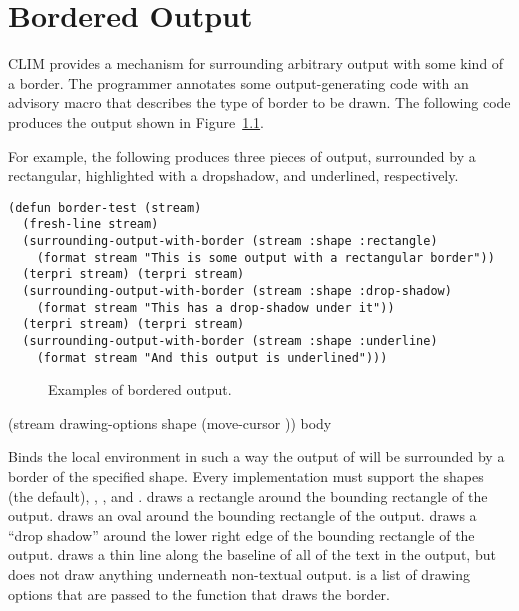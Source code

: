
\chapter {Bordered Output}
\label {bordered-output}

CLIM provides a mechanism for surrounding arbitrary output with some kind of a
border.  The programmer annotates some output-generating code with an advisory
macro that describes the type of border to be drawn.  The following code
produces the output shown in Figure~\ref{border-example}.

For example, the following produces three pieces of output, surrounded by a
rectangular, highlighted with a dropshadow, and underlined, respectively.

\begin{verbatim}
(defun border-test (stream)
  (fresh-line stream)
  (surrounding-output-with-border (stream :shape :rectangle)
    (format stream "This is some output with a rectangular border"))
  (terpri stream) (terpri stream)
  (surrounding-output-with-border (stream :shape :drop-shadow)
    (format stream "This has a drop-shadow under it"))
  (terpri stream) (terpri stream)
  (surrounding-output-with-border (stream :shape :underline)
    (format stream "And this output is underlined")))
\end{verbatim}

\begin{figure}
\ifpsfig\centerline{}\else\vspace{1.50in}\fi
\caption{\label{border-example} Examples of bordered output.}
\end{figure}


 {(\optional stream
                                             \rest drawing-options
                                             \key shape (move-cursor ))
                                            \body body}

Binds the local environment in such a way the output of  will be
surrounded by a border of the specified shape.  Every implementation must
support the shapes  (the default), , ,
and .   draws a rectangle around the bounding
rectangle of the output.   draws an oval around the bounding rectangle
of the output.   draws a ``drop shadow'' around the lower right
edge of the bounding rectangle of the output.   draws a thin line
along the baseline of all of the text in the output, but does not draw anything
underneath non-textual output.   is a list of drawing
options that are passed to the function that draws the border.

